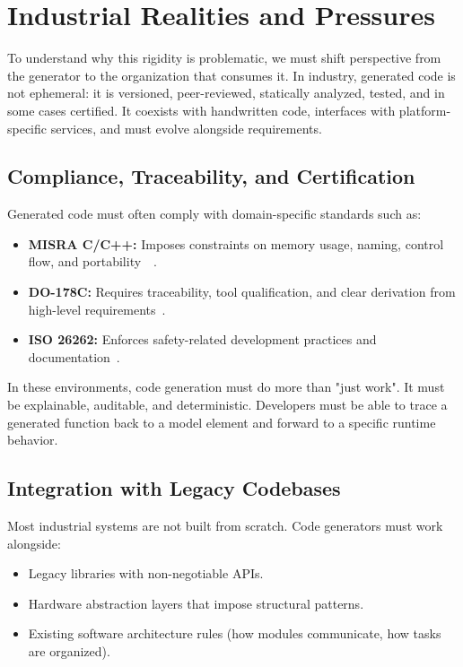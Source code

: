 \section{Industrial Realities and Pressures}
\label{sec:industrial_realities}

To understand why this rigidity is problematic, we must shift perspective from the generator to the organization that consumes it. In industry, generated code is not ephemeral: it is versioned, peer-reviewed, statically analyzed, tested, and in some cases certified. It coexists with handwritten code, interfaces with platform-specific services, and must evolve alongside requirements.

\subsection*{Compliance, Traceability, and Certification}

Generated code must often comply with domain-specific standards such as:

\begin{itemize}
	\item \textbf{\gls{MISRA} C/C++:} Imposes constraints on memory usage, naming, control flow, and portability~\cite{Misra_C_2025}~\cite{Misra_Cpp_2023}.
	\item \textbf{DO-178C:} Requires traceability, tool qualification, and clear derivation from high-level requirements~\cite{DO}. 
	\item \textbf{\gls{ISO} 26262:} Enforces safety-related development practices and documentation~\cite{Debouk_2019}.
\end{itemize} 

In these environments, code generation must do more than "just work". It must be explainable, auditable, and deterministic. Developers must be able to trace a generated function back to a model element and forward to a specific runtime behavior.

\subsection*{Integration with Legacy Codebases}

Most industrial systems are not built from scratch. Code generators must work alongside:

\begin{itemize}
	\item Legacy libraries with non-negotiable \gls{API}s.
	\item Hardware abstraction layers that impose structural patterns.
	\item Existing software architecture rules (how modules communicate, how tasks are organized).
\end{itemize}


